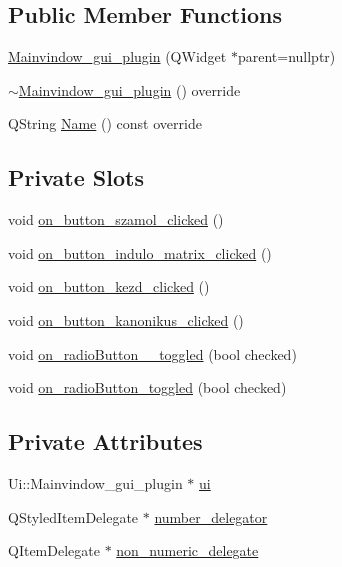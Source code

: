 \subsection*{Public Member Functions}
\begin{DoxyCompactItemize}
\item 
\hyperlink{classMainvindow__gui__plugin_afed5eb76ea21523ae97a36ed11d82b3f}{Mainvindow\+\_\+gui\+\_\+plugin} (Q\+Widget $\ast$parent=nullptr)
\item 
\hyperlink{classMainvindow__gui__plugin_a17a7101b7163acaa42f8026292d0a672}{$\sim$\+Mainvindow\+\_\+gui\+\_\+plugin} () override
\item 
Q\+String \hyperlink{classMainvindow__gui__plugin_affd8ce27d7e94a2adac287bc8dd835e0}{Name} () const override
\end{DoxyCompactItemize}
\subsection*{Private Slots}
\begin{DoxyCompactItemize}
\item 
void \hyperlink{classMainvindow__gui__plugin_af96459b75bff1299029ed450753b7c62}{on\+\_\+button\+\_\+szamol\+\_\+clicked} ()
\item 
void \hyperlink{classMainvindow__gui__plugin_a5d703f8eb1cc3a327861f0bc4f2e3439}{on\+\_\+button\+\_\+indulo\+\_\+matrix\+\_\+clicked} ()
\item 
void \hyperlink{classMainvindow__gui__plugin_a5c3a19e9e7e6cbe8a6f6fc16c88e16b4}{on\+\_\+button\+\_\+kezd\+\_\+clicked} ()
\item 
void \hyperlink{classMainvindow__gui__plugin_aa6705f09c4288a6bc9f5a08a995d3789}{on\+\_\+button\+\_\+kanonikus\+\_\+clicked} ()
\item 
void \hyperlink{classMainvindow__gui__plugin_a2dd76229829de1230f2f12928131d397}{on\+\_\+radio\+Button\+\_\+\_\+toggled} (bool checked)
\item 
void \hyperlink{classMainvindow__gui__plugin_a7e06d5ee7068a413da91bb8125ad4a7d}{on\+\_\+radio\+Button\+\_\+toggled} (bool checked)
\end{DoxyCompactItemize}
\subsection*{Private Attributes}
\begin{DoxyCompactItemize}
\item 
Ui\+::\+Mainvindow\+\_\+gui\+\_\+plugin $\ast$ \hyperlink{classMainvindow__gui__plugin_a86399ba5cca2bb2ab811afc6dd47ccc8}{ui}
\item 
Q\+Styled\+Item\+Delegate $\ast$ \hyperlink{classMainvindow__gui__plugin_a1ae497c20498fc8347d6d8c7691a4220}{number\+\_\+delegator}
\item 
Q\+Item\+Delegate $\ast$ \hyperlink{classMainvindow__gui__plugin_adabe60e85b8b8dedc41da660506595a1}{non\+\_\+numeric\+\_\+delegate}
\end{DoxyCompactItemize}


